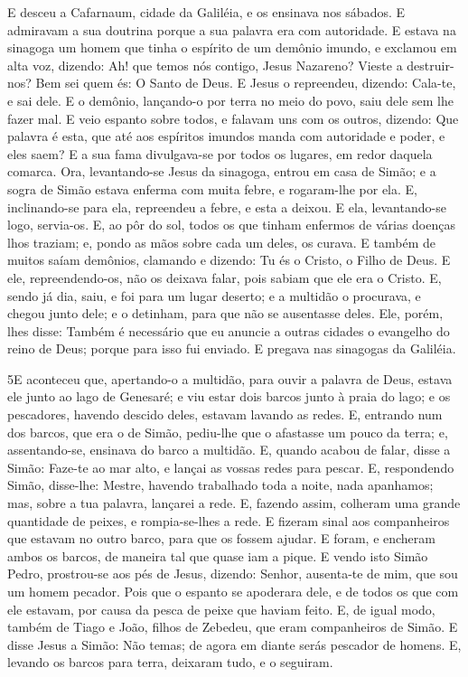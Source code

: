E desceu a Cafarnaum, cidade da Galiléia, e os ensinava nos
sábados. E admiravam a sua doutrina porque a sua palavra era
com autoridade. E estava na sinagoga um homem que tinha o
espírito de um demônio imundo, e exclamou em alta voz,
dizendo: Ah! que temos nós contigo, Jesus Nazareno? Vieste a
destruir-nos? Bem sei quem és: O Santo de Deus. E Jesus o
repreendeu, dizendo: Cala-te, e sai dele. E o demônio, lançando-o
por terra no meio do povo, saiu dele sem lhe fazer mal. E
veio espanto sobre todos, e falavam uns com os outros, dizendo: Que
palavra é esta, que até aos espíritos imundos manda com autoridade e
poder, e eles saem? E a sua fama divulgava-se por todos os
lugares, em redor daquela comarca. Ora, levantando-se Jesus
da sinagoga, entrou em casa de Simão; e a sogra de Simão estava
enferma com muita febre, e rogaram-lhe por ela. E,
inclinando-se para ela, repreendeu a febre, e esta a deixou. E ela,
levantando-se logo, servia-os. E, ao pôr do sol, todos os que
tinham enfermos de várias doenças lhos traziam; e, pondo as mãos
sobre cada um deles, os curava. E também de muitos saíam
demônios, clamando e dizendo: Tu és o Cristo, o Filho de Deus. E
ele, repreendendo-os, não os deixava falar, pois sabiam que ele era
o Cristo. E, sendo já dia, saiu, e foi para um lugar deserto;
e a multidão o procurava, e chegou junto dele; e o detinham, para
que não se ausentasse deles. Ele, porém, lhes disse: Também é
necessário que eu anuncie a outras cidades o evangelho do reino de
Deus; porque para isso fui enviado. E pregava nas sinagogas
da Galiléia.

\medskip

\lettrine{5} E aconteceu que, apertando-o a multidão, para
ouvir a palavra de Deus, estava ele junto ao lago de Genesaré; e
viu estar dois barcos junto à praia do lago; e os pescadores,
havendo descido deles, estavam lavando as redes. E, entrando num
dos barcos, que era o de Simão, pediu-lhe que o afastasse um pouco
da terra; e, assentando-se, ensinava do barco a multidão. E,
quando acabou de falar, disse a Simão: Faze-te ao mar alto, e lançai
as vossas redes para pescar. E, respondendo Simão, disse-lhe:
Mestre, havendo trabalhado toda a noite, nada apanhamos; mas, sobre
a tua palavra, lançarei a rede. E, fazendo assim, colheram uma
grande quantidade de peixes, e rompia-se-lhes a rede. E fizeram
sinal aos companheiros que estavam no outro barco, para que os
fossem ajudar. E foram, e encheram ambos os barcos, de maneira tal
que quase iam a pique. E vendo isto Simão Pedro, prostrou-se aos
pés de Jesus, dizendo: Senhor, ausenta-te de mim, que sou um homem
pecador. Pois que o espanto se apoderara dele, e de todos os que
com ele estavam, por causa da pesca de peixe que haviam feito.
E, de igual modo, também de Tiago e João, filhos de Zebedeu,
que eram companheiros de Simão. E disse Jesus a Simão: Não temas; de
agora em diante serás pescador de homens. E, levando os
barcos para terra, deixaram tudo, e o seguiram.

